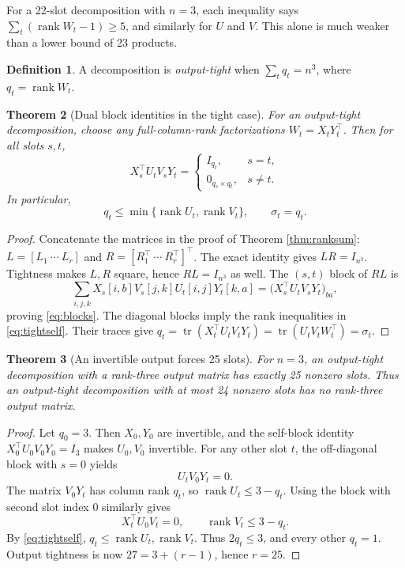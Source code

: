 \documentclass[11pt,letterpaper]{article}
\newtheorem{theorem}{Theorem}[section]
\theoremstyle{definition}\newtheorem{definition}[theorem]{Definition}
\theoremstyle{remark}\newtheorem{remark}[theorem]{Remark}
\DeclareMathOperator{\rank}{rank}\DeclareMathOperator{\tr}{tr}
\begin{document}
For a 22-slot decomposition with $n=3$, each inequality says
$\sum_t(\rank W_t-1)\ge5$, and similarly for $U$ and $V$.
This alone is much weaker than a lower bound of 23 products.

\begin{definition}
A decomposition is \emph{output-tight} when
$\sum_t q_t=n^3$, where $q_t=\rank W_t$.
\end{definition}

\begin{theorem}[Dual block identities in the tight case]\label{thm:tight}
For an output-tight decomposition, choose any full-column-rank
factorizations $W_t=X_tY_t^\top$. Then for all slots $s,t$,
\begin{equation}\label{eq:blocks}
X_s^\top U_tV_sY_t=
\begin{cases}
I_{q_t},&s=t,\\
0_{q_s\times q_t},&s\ne t.
\end{cases}
\end{equation}
In particular,
\begin{equation}\label{eq:tightself}
q_t\le\min\{\rank U_t,\rank V_t\},\qquad
\sigma_t=q_t.
\end{equation}
\end{theorem}
\begin{proof}
Concatenate the matrices in the proof of Theorem \ref{thm:ranksum}:
$L=[L_1\ \cdots\ L_r]$ and
$R=[R_1^\top\ \cdots\ R_r^\top]^\top$.
The exact identity gives $LR=I_{n^3}$.
Tightness makes $L,R$ square, hence $RL=I_{n^3}$ as well.
The $(s,t)$ block of $RL$ is
\[
\sum_{i,j,k}X_s[i,b]V_s[j,k]U_t[i,j]Y_t[k,a]
   =\bigl(X_s^\top U_tV_sY_t\bigr)_{ba},
\]
proving \eqref{eq:blocks}. The diagonal blocks imply the rank inequalities
in \eqref{eq:tightself}. Their traces give
$q_t=\tr(X_t^\top U_tV_tY_t)
=\tr(U_tV_tW_t^\top)=\sigma_t$.
\end{proof}

\begin{theorem}[An invertible output forces 25 slots]\label{thm:fullrank}
For $n=3$, an output-tight decomposition with a rank-three output matrix
has exactly 25 nonzero slots. Thus an output-tight decomposition with at
most 24 nonzero slots has no rank-three output matrix.
\end{theorem}
\begin{proof}
Let $q_0=3$. Then $X_0,Y_0$ are invertible, and the self-block identity
$X_0^\top U_0V_0Y_0=I_3$ makes $U_0,V_0$ invertible.
For any other slot $t$, the off-diagonal block with $s=0$ yields
\[
U_tV_0Y_t=0.
\]
The matrix $V_0Y_t$ has column rank $q_t$, so
$\rank U_t\le3-q_t$.
Using the block with second slot index 0 similarly gives
\[
X_t^\top U_0V_t=0,\qquad\rank V_t\le3-q_t.
\]
By \eqref{eq:tightself}, $q_t\le\rank U_t,\rank V_t$.
Thus $2q_t\le3$, and every other $q_t=1$.
Output tightness is now $27=3+(r-1)$, hence $r=25$.
\end{proof}
\end{document}
